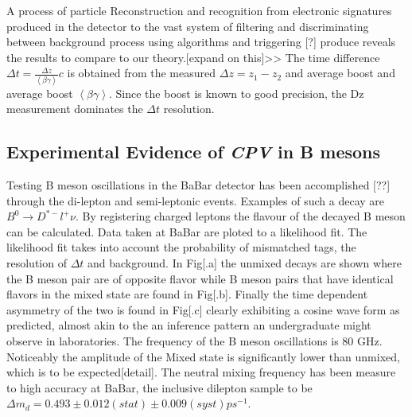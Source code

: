 A process of particle Reconstruction and recognition from electronic signatures produced in the detector to the vast system of filtering and discriminating between background process using algorithms and triggering [?] produce reveals the results to compare to our theory.[expand on this]>> The time difference $\Delta t = \frac{\Delta z}{\left< \beta\gamma\right>} c$ is obtained from the measured $\Delta z=z_1 - z_2$ and average boost and average boost $\left<\beta\gamma\right>$. Since the boost is known to good precision, the Dz measurement dominates the $\Delta t$ resolution.
\subsection{Experimental Evidence of \textit{CPV} in B mesons}
Testing B meson oscillations in the BaBar detector has been accomplished [??] through the di-lepton and semi-leptonic events. Examples of such a decay are 
$B^{0}\rightarrow D^{*-}l^{+}\nu$. By registering charged leptons the flavour of the decayed B meson can be calculated. Data taken at BaBar are ploted to a likelihood fit. The likelihood fit takes into account the probability of mismatched tags, the resolution of $\Delta t$ and background. In Fig[.a] the unmixed decays are shown where the B meson pair are of opposite flavor while B meson pairs that have identical flavors in the mixed state are found in Fig[.b]. Finally the  time dependent asymmetry of the two is found in Fig[.c] clearly exhibiting a cosine wave form as predicted, almost akin to the an inference pattern an undergraduate might observe in laboratories. The frequency of the B meson oscillations is 80 GHz. Noticeably the amplitude of the Mixed state is significantly lower than unmixed, which is to be expected[detail]. The neutral mixing frequency has been measure to high accuracy at BaBar, the inclusive dilepton sample to be $\Delta m_d = 0.493 \pm 0.012(stat) \pm 0.009(syst) ps^{-1}$.


